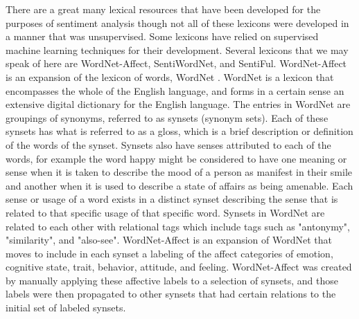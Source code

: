 \documentclass[letterpaper, 10 pt, conference]{ieeeconf}
\begin{document}
There are a great many lexical resources that have been developed for the purposes of sentiment analysis though not all of these lexicons were developed in a manner that was unsupervised. Some lexicons have relied on supervised machine learning techniques for their development. Several lexicons that we may speak of here are WordNet-Affect, SentiWordNet, and SentiFul. WordNet-Affect is an expansion of the lexicon of words, WordNet \textcolor{gray}{\cite{Strapparava,WordNet}}. WordNet is a lexicon that encompasses the whole of the English language, and forms in a certain sense an extensive digital dictionary for the English language. The entries in WordNet are groupings of synonyms, referred to as synsets (synonym sets). Each of these synsets has what is referred to as a gloss, which is a brief description or definition of the words of the synset. Synsets also have senses attributed to each of the words, for example the word happy might be considered to have one meaning or sense when it is taken to describe the mood of a person as manifest in their smile and another when it is used to describe a state of affairs as being amenable. Each sense or usage of a word exists in a distinct synset describing the sense that is related to that specific usage of that specific word. Synsets in WordNet are related to each other with relational tags which include tags such as "antonymy", "similarity", and "also-see". WordNet-Affect is an expansion of WordNet that moves to include in each synset a labeling of the affect categories of emotion, cognitive state, trait, behavior, attitude, and feeling. WordNet-Affect was created by manually applying these affective labels to a selection of synsets, and those labels were then propagated to other synsets that had certain relations to the initial set of labeled synsets.
\end{document}
